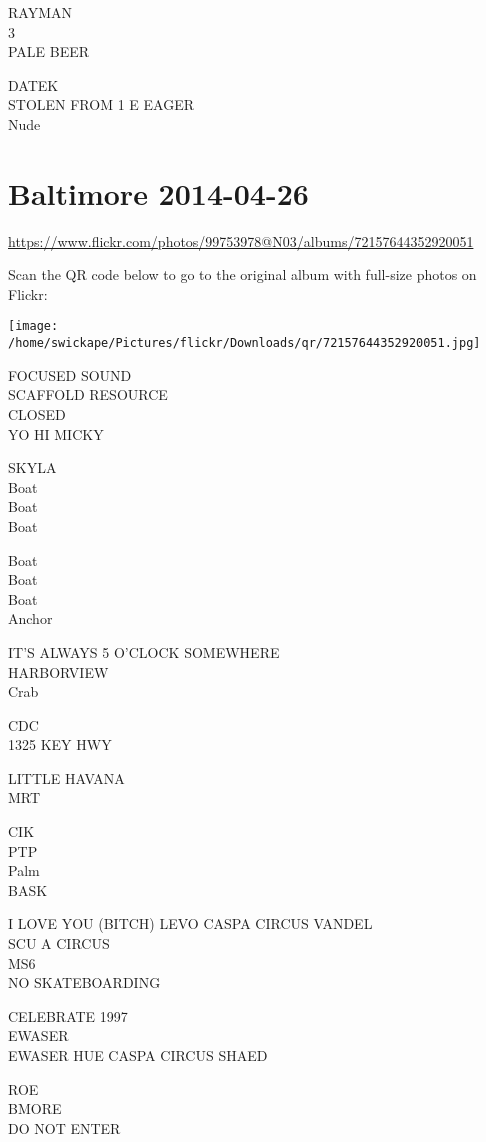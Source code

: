 \documentclass[10pt,letterpaper]{article}
\begin{document}
RAYMAN\\
3\\
PALE BEER

DATEK\\
STOLEN FROM 1 E EAGER\\
Nude
\pagebreak

\section*{Baltimore 2014-04-26}

\url{https://www.flickr.com/photos/99753978@N03/albums/72157644352920051}

Scan the QR code below to go to the original album with full-size photos on Flickr:

\texttt{[image: /home/swickape/Pictures/flickr/Downloads/qr/72157644352920051.jpg]}
\pagebreak

FOCUSED SOUND\\
SCAFFOLD RESOURCE\\
CLOSED\\
YO HI MICKY

SKYLA\\
Boat\\
Boat\\
Boat

Boat\\
Boat\\
Boat\\
Anchor

IT'S ALWAYS 5 O'CLOCK SOMEWHERE\\
HARBORVIEW\\
Crab

CDC\\
1325 KEY HWY

LITTLE HAVANA\\
MRT

CIK\\
PTP\\
Palm\\
BASK

I LOVE YOU (BITCH) LEVO CASPA CIRCUS VANDEL\\
SCU A CIRCUS\\
MS6\\
NO SKATEBOARDING

CELEBRATE 1997\\
EWASER\\
EWASER HUE CASPA CIRCUS SHAED

ROE\\
BMORE\\
DO NOT ENTER
\end{document}
